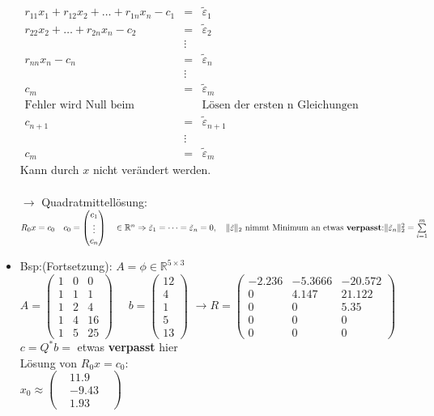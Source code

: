 \documentclass[ngerman]{tudscrreprt}
\begin{document}
\begin{itemize}
$
\begin{matrix}
r_{11} x_1 + r_{12} x_2 + \dots + r_{1n} x_n - c_1 & = &  \tilde{\varepsilon}_1 \\
r_{22} x_2 + \dots + r_{2n} x_n - c_2              & = &  \tilde{\varepsilon}_2 \\
& \vdots& \\
r_{nn} x_n - c_n & = &  \tilde{\varepsilon}_{n}\\
&\vdots& \\
c_m& = & \tilde{\varepsilon}_{m} \\
\text{Fehler wird Null beim}& &\text{Lösen der ersten n Gleichungen} \\
c_{n+1} & = &  \tilde{\varepsilon}_{n+1}\\
&\vdots&\\
c_{m}& = & \tilde{\varepsilon}_{m} 
\end{matrix}
$\\
Kann durch $x$ nicht verändert werden.\\
\\
$\rightarrow$  Quadratmittellösung: $R_0 x = c_0 \quad
c_0 = 
\begin{pmatrix}
c_1\\
\vdots\\
c_n
\end{pmatrix}\quad \in \mathbb{R}^n\\
\Rightarrow \tilde \varepsilon_1 = \dots  = \tilde \varepsilon_n = 0, \quad \|\tilde \varepsilon\|_2 \text{ nimmt Minimum an etwas \textbf{verpasst}:} \|\tilde \varepsilon_n\|_2^2 = \sum \limits_{ i = 1}^{m} 
$
\\
\item Bsp:(Fortsetzung): $A= \phi \in \mathbb{R}^{5\times 3}$\\

$A = 
\begin{pmatrix}
1 & 0 & 0 \\
1 & 1 & 1 \\
1 & 2 & 4 \\
1 & 4 & 16 \\
1 & 5 & 25 
\end{pmatrix} \quad
$
$ 
b=
\begin{pmatrix}
12\\
4\\
1\\
5\\
13
\end{pmatrix}
$
$\rightarrow R=
\begin{pmatrix}
-2.236 & -5.3666 & -20.572 \\
0 & 4.147 & 21.122 \\
0 & 0 & 5.35 \\
0 & 0 & 0 \\
0 & 0 & 0 
\end{pmatrix} 
$
$ c= Q^* b = $ etwas \textbf{verpasst} hier
\\
Lösung von $ R_0 x = c_0 : $ \\
$ x_0 \approx 
\begin{pmatrix}
&11.9&\\
&-9.43 &\\
& 1.93&
\end{pmatrix}
$
\end{itemize}
\end{document}
